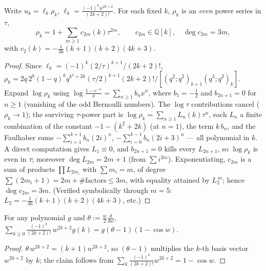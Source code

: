 \begin{lemma}\label{lem:Bconf}
Write $u_k=\ell_k\rho_k$, $\ell_k=\frac{(-1)^kw^{2k+2}}{(2k+2)!}$. For each fixed $k$, $\rho_k$ is an \emph{even}
power series in $\tau$,
\[
  \rho_k=1+\sum_{m\ge1}c_{2m}(k)\tau^{2m},\qquad c_{2m}\in\mathbb Q[k],\quad\deg c_{2m}=3m,
\]
with $c_2(k)=-\tfrac1{36}(k+1)(k+2)(4k+3)$.
\end{lemma}
\begin{proof}
Since $\ell_k=(-1)^k(2/\tau)^{k+1}/(2k+2)!$,
$\rho_k=2q\,2^k(1-q)^kq^{k^2+2k}(\tau/2)^{k+1}(2k+2)!\big/[(q^2;q^2)_{k+1}(q^3;q^2)_k]$. Expand $\log\rho_k$ using
$\log\frac{1-e^{-x}}{x}=\sum_{n\ge1}b_nx^n$, where $b_1=-\tfrac12$ and $b_{2n+1}=0$ for $n\ge1$ (vanishing of the
odd Bernoulli numbers). The $\log\tau$ contributions cancel ($\rho_k\to1$); the surviving $\tau$-power part is
$\log\rho_k=\sum_{n\ge1}L_n(k)\tau^n$, each $L_n$ a finite combination of the constant $-1-(k^2+2k)$ (at $n=1$),
the term $k\,b_n$, and the Faulhaber sums $-\sum_{i=1}^{k+1}b_n(2i)^n$, $-\sum_{i=0}^{k-1}b_n(2i+3)^n$ --- all
polynomial in $k$. A direct computation gives $L_1\equiv0$, and $b_{2n+1}=0$ kills every $L_{2n+1}$, so
$\log\rho_k$ is even in $\tau$; moreover $\deg L_{2m}=2m+1$ (from $\sum i^{2m}$). Exponentiating, $c_{2m}$ is a sum
of products $\prod L_{2m_i}$ with $\sum m_i=m$, of degree $\sum(2m_i+1)=2m+\#\text{factors}\le3m$, with equality
attained by $L_2^{\,m}$; hence $\deg c_{2m}=3m$. \textup(Verified symbolically through $m=5$:
$L_2=-\tfrac1{36}(k{+}1)(k{+}2)(4k{+}3)$, etc.\textup)
\end{proof}

\begin{lemma}\label{lem:Cop}
For any polynomial $g$ and $\theta:=\tfrac w2\tfrac{d}{dw}$,\
$\displaystyle\sum_{k\ge0}\frac{(-1)^k}{(2k+2)!}\,w^{2k+2}g(k)=g(\theta-1)(1-\cos w)$.
\end{lemma}
\begin{proof}
$\theta\,w^{2k+2}=(k+1)w^{2k+2}$, so $(\theta-1)$ multiplies the $k$-th basis vector $w^{2k+2}$ by $k$; the claim
follows from $\sum_k\frac{(-1)^k}{(2k+2)!}w^{2k+2}=1-\cos w$.
\end{proof}


